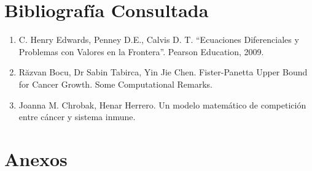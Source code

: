 \documentclass[a4 paper, 12pt]{article}
\begin{document}
\section{Bibliograf\'ia Consultada}
\begin{enumerate}
\item C. Henry Edwards, Penney D.E., Calvis D. T. “Ecuaciones Diferenciales y Problemas con Valores en la Frontera”. Pearson Education, 2009.
\item Răzvan Bocu, Dr Sabin Tabirca, Yin Jie Chen. Fister-Panetta Upper Bound for Cancer Growth. Some Computational Remarks.
\item Joanna M. Chrobak, Henar Herrero. Un modelo matem\'atico de competici\'on entre c\'ancer y sistema inmune.
\end{enumerate}

\section{Anexos}
\end{document}
